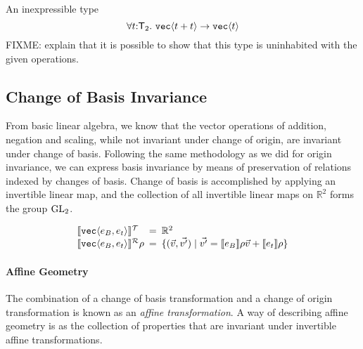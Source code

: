 \begin{example}
  An inexpressible type
  \begin{displaymath}
    \forall t \mathord: \mathsf{T}_2.\ \texttt{vec}\langle t + t \rangle \to \texttt{vec}\langle t \rangle
  \end{displaymath}
  FIXME: explain that it is possible to show that this type is
  uninhabited with the given operations.
\end{example}

\subsection{Change of Basis Invariance}
\label{sec:motivation-generalising}

From basic linear algebra, we know that the vector operations of
addition, negation and scaling, while not invariant under change of
origin, are invariant under change of basis. Following the same
methodology as we did for origin invariance, we can express basis
invariance by means of preservation of relations indexed by changes of
basis. Change of basis is accomplished by applying an invertible
linear map, and the collection of all invertible linear maps on
$\mathbb{R}^2$ forms the group $\mathrm{GL}_2$.


\begin{displaymath}
  \begin{array}{l@{\hspace{0.5em}=\hspace{0.5em}}l}
    \tySem{\tyPrim{vec}{e_B,e_t}} & \mathbb{R}^2 \\
    \rsem{\tyPrim{vec}{e_B,e_t}}{}\rho & \{ (\vec{v},\vec{v'}) \sepbar \vec{v'} = \sem{e_B}\rho\vec{v} + \sem{e_t}\rho \}
  \end{array}
\end{displaymath}


\paragraph{Affine Geometry} The combination of a change of basis
transformation and a change of origin transformation is known as an
\emph{affine transformation}. A way of describing affine geometry is
as the collection of properties that are invariant under invertible
affine transformations.

